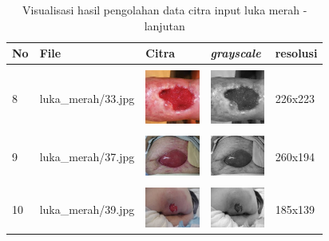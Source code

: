\begin{table}[H]
	\centering
	\caption{Visualisasi hasil pengolahan data citra input luka merah - lanjutan}
	\label{tabel_input_9}
	\begin{tabular}{|m{0.2in}|m{1.2in}|m{0.7in}|m{0.7in}|m{0.7in}|}
		\hline
		\textbf{No} & \textbf{File} & \textbf{Citra} & \textbf{\emph{grayscale}} & \textbf{resolusi} \\
		\hline
		
		& &  &  &\\
		8 & 
		luka\_merah/33.jpg &
		\includegraphics[width=0.7in]{dataset/dataset_3/luka_merah/ready/33.jpg}&
		\includegraphics[width=0.7in]{dataset/dataset_3/luka_merah/ready/33_gray.jpg}&
		226x223\\
		\hline
		
		& &  &  &\\
		9& 
		luka\_merah/37.jpg &
		\includegraphics[width=0.7in]{dataset/dataset_3/luka_merah/ready/37.jpg}&
		\includegraphics[width=0.7in]{dataset/dataset_3/luka_merah/ready/37_gray.jpg}&
		260x194\\
		\hline
		
		& &  &  &\\
		10& 
		luka\_merah/39.jpg &
		\includegraphics[width=0.7in]{dataset/dataset_3/luka_merah/ready/39.jpg}&
		\includegraphics[width=0.7in]{dataset/dataset_3/luka_merah/ready/39_gray.jpg}&
		185x139\\
		\hline
		

\end{tabular}
\end{table}
